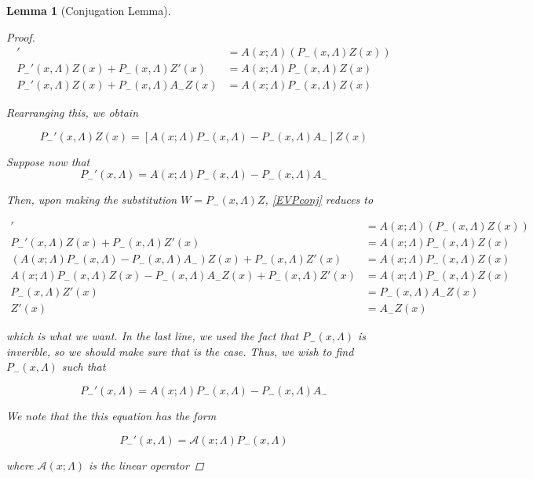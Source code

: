 \documentclass[12pt]{article}
\newtheorem{lemma}{Lemma}
\begin{document}
\begin{lemma}[Conjugation Lemma]
\begin{proof}
\begin{align*}
[P_-(x, \Lambda) Z(x)]' &= A(x; \Lambda)(P_-(x, \Lambda) Z(x)) \\
P_-'(x, \Lambda) Z(x) + P_-(x, \Lambda) Z'(x)
&= A(x; \Lambda)P_-(x, \Lambda) Z(x) \\
P_-'(x, \Lambda) Z(x) + P_-(x, \Lambda) A_- Z(x)
&= A(x; \Lambda)P_-(x, \Lambda) Z(x)
\end{align*}

Rearranging this, we obtain

\begin{equation}
P_-'(x, \Lambda) Z(x)
= [A(x; \Lambda)P_-(x, \Lambda) - P_-(x, \Lambda) A_-]Z(x)
\end{equation}

Suppose now that
\[
P_-'(x, \Lambda) = A(x; \Lambda)P_-(x, \Lambda) - P_-(x, \Lambda) A_-
\]

Then, upon making the substitution $W = P_-(x, \Lambda) Z$, \eqref{EVPconj} reduces to

\begin{align*}
[P_-(x, \Lambda) Z(x)]' &= A(x; \Lambda)(P_-(x, \Lambda) Z(x)) \\
P_-'(x, \Lambda) Z(x) + P_-(x, \Lambda) Z'(x)
&= A(x; \Lambda)P_-(x, \Lambda) Z(x) \\
(A(x; \Lambda)P_-(x, \Lambda) - P_-(x, \Lambda) A_-)Z(x) + P_-(x, \Lambda) Z'(x)
&= A(x; \Lambda)P_-(x, \Lambda) Z(x) \\
A(x; \Lambda)P_-(x, \Lambda)Z(x) - P_-(x, \Lambda) A_- Z(x) + P_-(x, \Lambda) Z'(x)
&= A(x; \Lambda)P_-(x, \Lambda) Z(x) \\
P_-(x, \Lambda) Z'(x) &= P_-(x, \Lambda) A_- Z(x) \\
Z'(x) &= A_- Z(x)
\end{align*}

which is what we want. In the last line, we used the fact that $P_-(x, \Lambda)$ is inverible, so we should make sure that is the case. Thus, we wish to find $P_-(x, \Lambda)$ such that

\[
P_-'(x, \Lambda) = A(x; \Lambda)P_-(x, \Lambda) - P_-(x, \Lambda) A_-
\]

We note that the this equation has the form 

\begin{equation}\label{solvePminus}
P_-'(x, \Lambda) = \mathcal{A}(x; \Lambda) P_-(x, \Lambda)
\end{equation}

where $\mathcal{A}(x; \Lambda)$ is the linear operator


\end{proof}
\end{lemma}
\end{document}
